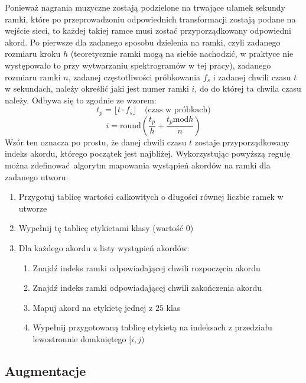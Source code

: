 Ponieważ nagrania muzyczne zostają podzielone na trwające ułamek sekundy ramki, które po przeprowadzoniu odpowiednich transformacji zostają podane na wejście sieci, to każdej takiej ramce musi zostać przyporządkowany odpowiedni akord. Po pierwsze dla zadanego sposobu dzielenia na ramki, czyli zadanego rozmiaru kroku $h$ (teoretycznie ramki mogą na siebie nachodzić, w praktyce nie występowało to przy wytwarzaniu spektrogramów w tej pracy), zadanego rozmiaru ramki $n$, zadanej częstotliwości próbkowania $f_s$ i zadanej chwili czasu $t$ w sekundach, należy określić jaki jest numer ramki $i$, do do której ta chwila czasu należy. Odbywa się to zgodnie ze wzorem:
\begin{equation}
    t_p = \lfloor t \cdot f_s \rfloor \quad \textrm{(czas w próbkach)}
\end{equation}
\begin{equation}
    i = \textrm{round}(\frac{t_p}{h} + \frac{t_p \textrm{mod} h}{n})
\end{equation}
Wzór ten oznacza po prostu, że danej chwili czasu $t$ zostaje przyporządkowany indeks akordu, którego początek jest najbliżej. Wykorzystując powyższą regułę można zdefinować algorytm mapowania wystąpień akordów na ramki dla zadanego utworu:
\begin{enumerate}
    \item Przygotuj tablicę wartości całkowitych o długości równej liczbie ramek w utworze
    \item Wypełnij tę tablicę etykietami klasy  (wartość $0$)
    \item Dla każdego akordu z listy wystąpień akordów:
        \begin{enumerate}
            \item Znajdź indeks  ramki odpowiadającej chwili rozpoczęcia akordu
            \item Znajdź indeks  ramki odpowiadającej chwili zakończenia akordu
            \item Mapuj akord na etykietę  jednej z $25$ klas
            \item Wypełnij przygotowaną tablicę etykietą  na indeksach z przedziału
                lewostronnie domkniętego $[i,j)$
        \end{enumerate}
\end{enumerate}

\subsection{Augmentacje}


